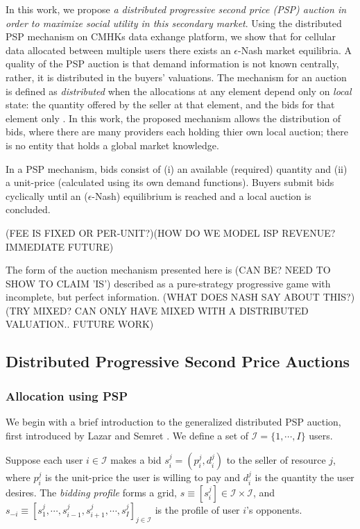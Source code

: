 \documentclass[12pt]{article}
\theoremstyle{definition}
\newcommand{\mcI}{\mathcal{I}}
\begin{document}
\begin{multicols}{2}
In this work, we propose \emph{a distributed progressive second price (PSP) auction in
order to maximize social utility in this secondary market}. Using the
distributed PSP mechanism on CMHKs data
exhange platform, we show that for cellular data allocated between multiple users there
exists an $\epsilon$-Nash market equilibria. A quality of the PSP auction is that
demand information is not known centrally, rather, it is distributed in the
buyers' valuations. The mechanism for an auction is defined
as \emph{distributed} when the allocations at any element depend only on
\emph{local} state: the quantity offered by the seller at that element, and the
bids for that element only \cite{lazar}. In this work, the proposed mechanism
allows the distribution of bids, where there are many providers each holding
thier own local auction; there is no entity that holds a global market knowledge.

In a PSP mechanism, bids consist of (i) an available (required) quantity and (ii) a unit-price (calculated
using its own demand functions). Buyers submit bids cyclically until an
($\epsilon$-Nash) equilibrium is reached and a local auction is concluded. 

(FEE IS FIXED OR
PER-UNIT?)(HOW DO WE MODEL ISP REVENUE? IMMEDIATE FUTURE)

The form of the auction mechanism presented here is (CAN BE? NEED TO SHOW TO
CLAIM 'IS') described as a
pure-strategy progressive game with incomplete, but perfect information. (WHAT
DOES NASH SAY ABOUT THIS?) (TRY MIXED? CAN ONLY HAVE MIXED WITH A DISTRIBUTED
VALUATION.. FUTURE WORK) 

\subsection{Distributed Progressive Second Price Auctions}

\subsubsection{Allocation using PSP}

We begin with a brief introduction to the generalized distributed PSP auction, first introduced by Lazar and Semret \cite{lazar}.
We define a set of $\mcI = \lbrace 1,\cdots,I\rbrace$ users.

Suppose each user $i \in \mcI$ makes a bid $s_i^j = (p_i^j, d_i^j)$ to the
seller of resource $j$, where $p_i^j$ is the unit-price the user is willing to
pay and $d_i^j$ is the quantity the user desires. The \emph{bidding profile} forms a grid, $s \equiv
[s_i^j] \in \mcI \times \mcI$, and $s_{-i} \equiv [s_1^j , \cdots , s_{i−1}^j , s_{i+1}^j , \cdots
, s_I^j]_{j\in\mcI}$ is the profile of user $i$'s opponents. 


\end{multicols}
\end{document}
